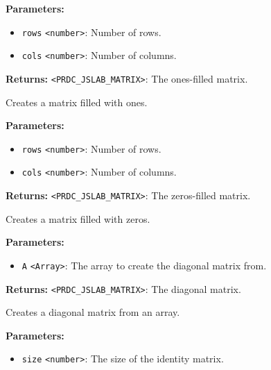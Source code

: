 \documentclass[12pt,a4paper]{article}
\begin{document}
\noindent \textbf{Parameters:}
\begin{itemize}
  \item \texttt{rows} \texttt{<number>}: Number of rows.
  \item \texttt{cols} \texttt{<number>}: Number of columns.
\end{itemize}

\noindent \textbf{Returns:} \texttt{<PRDC\_JSLAB\_MATRIX>}: The ones-filled matrix.

\noindent Creates a matrix filled with ones.

\vspace{5mm}
\noindent {}


\noindent \textbf{Parameters:}
\begin{itemize}
  \item \texttt{rows} \texttt{<number>}: Number of rows.
  \item \texttt{cols} \texttt{<number>}: Number of columns.
\end{itemize}

\noindent \textbf{Returns:} \texttt{<PRDC\_JSLAB\_MATRIX>}: The zeros-filled matrix.

\noindent Creates a matrix filled with zeros.

\vspace{5mm}
\noindent {}


\noindent \textbf{Parameters:}
\begin{itemize}
  \item \texttt{A} \texttt{<Array>}: The array to create the diagonal matrix from.
\end{itemize}

\noindent \textbf{Returns:} \texttt{<PRDC\_JSLAB\_MATRIX>}: The diagonal matrix.

\noindent Creates a diagonal matrix from an array.

\vspace{5mm}
\noindent {}


\noindent \textbf{Parameters:}
\begin{itemize}
  \item \texttt{size} \texttt{<number>}: The size of the identity matrix.
\end{itemize}
\end{document}
